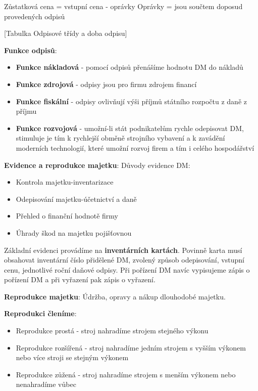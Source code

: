 \documentclass[11pt,a4paper,twoside]{book}
\begin{document}
	\begin{center}
	Zůstatková cena = vstupní cena - oprávky
	Oprávky = jsou součtem doposud provedených odpisů	
	\end{center}

	[Tabulka Odpisové třídy a doba odpisu]

	\textbf{Funkce odpisů}:
	\begin{itemize}
		\item \textbf{Funkce nákladová} - pomocí odpisů přenášíme hodnotu DM do nákladů
		\item \textbf{Funkce zdrojová} - odpisy jsou pro firmu zdrojem financí
		\item \textbf{Funkce fiskální} - odpisy ovlivňují výši příjmů státního rozpočtu z daně z příjmu
		\item \textbf{Funkce rozvojová} - umožní-li stát podnikatelům rychle odepisovat DM, stimuluje je tím k rychlejší obměně strojního vybavení a k zavádění moderních technologií, které umožní rozvoj firem a tím i celého hospodářství
	\end{itemize}

	\textbf{Evidence a reprodukce majetku}:
	Důvody evidence DM:
	\begin{itemize}
		\item Kontrola majetku-inventarizace
		\item Odepisování majetku-účetnictví a daně
		\item Přehled o finanční hodnotě firmy
		\item Úhrady škod na majetku pojišťovnou
	\end{itemize}

	Základní evidenci provádíme na \textbf{inventárních kartách}.
	Povinně karta musí obsahovat inventární číslo přidělené DM, zvolený způsob odepisování, vstupní cenu, jednotlivé roční daňové odpisy.
	Při pořízení DM navíc vypisujeme zápis o pořízení DM a při vyřazení pak zápis o vyřazení.

	\textbf{Reprodukce majetku}:
	Údržba, opravy a nákup dlouhodobé majetku.

	\textbf{Reprodukci členíme}:
	\begin{itemize}
		\item Reprodukce prostá - stroj nahradíme strojem stejného výkonu
		\item Reprodukce rozšířená - stroj nahradíme jedním strojem s vyšším výkonem nebo více stroji se stejným výkonem
		\item Reprodukce zůžená - stroj nahradíme strojem s menším výkonem nebo nenahradíme vůbec
	\end{itemize}
\end{document}
